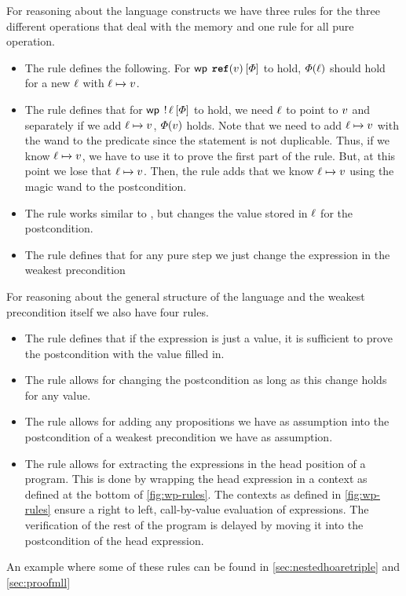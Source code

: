 \documentclass[thesis.tex]{subfiles}
\begin{document}
For reasoning about the language constructs we have three rules for the three different operations that deal with the memory and one rule for all pure operation.
\begin{itemize}
    \item The rule  defines the following. For $\wpre{\Alloc(\val)}{\pred}$ to hold, $\varPhi(\ell)$ should hold for a new $\ell$ with $\loc\fmapsto\val$.
    \item The rule  defines that for $\wpre{\deref \loc}{\pred}$ to hold, we need $\ell$ to point to $v$ and separately if we add $\loc\fmapsto\val$, $\varPhi(v)$ holds. Note that we need to add $\loc\fmapsto\val$ with the wand to the predicate since the statement is not duplicable. Thus, if we know $\loc\fmapsto\val$, we have to use it to prove the first part of the  rule. But, at this point we lose that $\loc\fmapsto\val$. Then, the  rule adds that we know $\loc\fmapsto\val$ using the magic wand to the postcondition.
    \item The rule  works similar to , but changes the value stored in $\ell$ for the postcondition.
    \item The rule  defines that for any pure step we just change the expression in the weakest precondition
\end{itemize}
For reasoning about the general structure of the language and the weakest precondition itself we also have four rules.
\begin{itemize}
    \item The rule  defines that if the expression is just a value, it is sufficient to prove the postcondition with the value filled in.
    \item The rule  allows for changing the postcondition as long as this change holds for any value.
    \item The rule  allows for adding any propositions we have as assumption into the postcondition of a weakest precondition we have as assumption.
    \item The rule  allows for extracting the expressions in the head position of a program. This is done by wrapping the head expression in a context as defined at the bottom of \cref{fig:wp-rules}. The contexts as defined in \cref{fig:wp-rules} ensure a right to left, call-by-value evaluation of expressions. The verification of the rest of the program is delayed by moving it into the postcondition of the head expression.
\end{itemize}
An example where some of these rules can be found in \cref{sec:nestedhoaretriple} and \cref{sec:proofmll}
\end{document}
